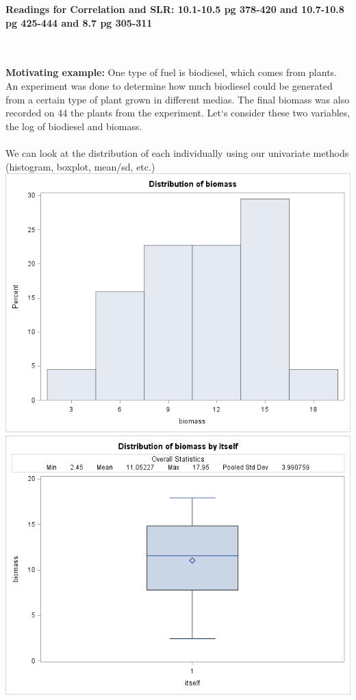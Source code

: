 \begin{center}\large\textbf{Readings for Correlation and SLR: 10.1-10.5 pg 378-420 and 10.7-10.8 pg 425-444 and 8.7 pg 305-311}\\
\normalsize \end{center}
\large \hlinewd{2pt}
~\\~\\
\textbf{Motivating example:} One type of fuel is biodiesel, which comes from plants.  An experiment was done to determine how much biodiesel could be generated from a certain type of plant grown in different medias.  The final biomass was also recorded on 44 the plants from the experiment.  Let`s consider these two variables, the log of biodiesel and biomass.  \\~\\
We can look at the distribution of each individually using our univariate methods (histogram, boxplot, mean/sd, etc.)\\
\includegraphics[scale=0.45]{biomasshist}\includegraphics[scale=0.45]{biomassboxplot}\\

